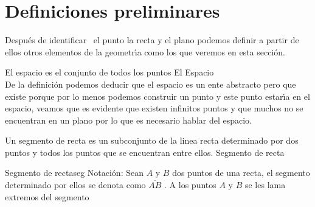 \documentclass[12pt]{book}
\begin{document}
\section{Definiciones preliminares}
Despu\'{e}s de identificar \ el punto la recta y el plano podemos definir a
partir de \\ ellos otros elementos de la geometr\'{\i}a como los que veremos en
esta secci\'{o}n. \\
\begin{definicion}{El espacio es el conjunto de todos los puntos \hfill}{El Espacio}
\\
De la definici\'{o}n podemos deducir que el espacio es un ente abstracto
pero que existe porque por lo menos podemos construir un punto y este punto
estar\'{\i}a en el espacio, veamos que es evidente que existen infinitos puntos y
que muchos no se encuentran en un plano por lo que es necesario hablar del
espacio.
\end{definicion}
\begin{definicion}{Un segmento de recta es un subconjunto de la linea recta determinado por dos
puntos y todos los puntos que se encuentran entre ellos.
}{Segmento de recta}
 \begin{figura}{
}{Segmento de recta}{seg}
 Notaci\'{o}n: Sean $A$ y $B$ dos puntos de una recta, el segmento
determinado por ellos se denota como $\overline{AB}$ . A los puntos $A$ y $B$
se les lama extremos del segmento
 \end{figura}
\end{definicion}
\end{document}
